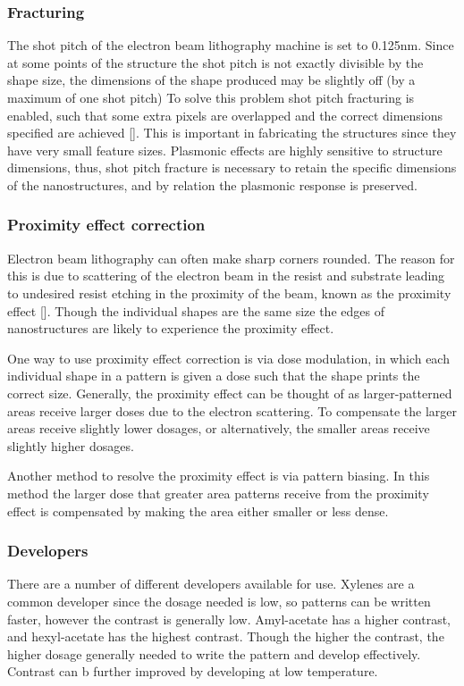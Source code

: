 \subsubsection{Fracturing}
The shot pitch of the electron beam lithography machine is set to 0.125nm. Since at some points of the structure the shot pitch is not exactly divisible by the shape size, the dimensions of the shape produced may be slightly off (by a maximum of one shot pitch)  To solve this problem shot pitch fracturing is enabled, such that some extra pixels are overlapped and the correct dimensions specified are achieved [\cite{BEAMER}]. This is important in fabricating the structures since they have very small feature sizes. Plasmonic effects are highly sensitive to structure dimensions, thus, shot pitch fracture is necessary to retain the specific dimensions of the nanostructures, and by relation the plasmonic response is preserved.
\subsubsection{Proximity effect correction}
Electron beam lithography can often make sharp corners rounded. The reason for this is due to scattering of the electron beam in the resist and substrate leading to undesired resist etching in the proximity of the beam, known as the proximity effect [\cite{PEC}]. Though the individual shapes are the same size the edges of nanostructures are likely to experience the proximity effect.

One way to use proximity effect correction is via dose modulation, in which each individual shape in a pattern is given a dose such that the shape prints the correct size. Generally, the proximity effect can be thought of as larger-patterned areas receive larger doses due to the electron scattering. To compensate the larger areas receive slightly lower dosages, or alternatively, the smaller areas receive slightly higher dosages.

Another method to resolve the proximity effect is via pattern biasing. In this method the larger dose that greater area patterns receive from the proximity effect is compensated by making the area either smaller or less dense. 

\subsubsection{Developers}
There are a number of different developers available for use. Xylenes are a common developer since the dosage needed is low, so patterns can be written faster, however the contrast is generally low. Amyl-acetate has a higher contrast, and hexyl-acetate has the highest contrast. Though the higher the contrast, the higher dosage generally needed to write the pattern and develop effectively. Contrast can b further improved by developing at low temperature.\\

